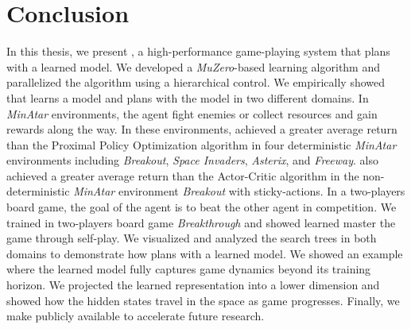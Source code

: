 \chapter{Conclusion}

In this thesis, we present \moozi, a high-performance game-playing system that plans with a learned model.
We developed a \textit{MuZero}-based learning algorithm and parallelized the algorithm using a hierarchical control.
We empirically showed that \moozi learns a model and plans with the model in two different domains.
In \textit{MinAtar} environments, the agent fight enemies or collect resources and gain rewards along the way.
In these environments, \moozi achieved a greater average return than the Proximal Policy Optimization algorithm in four deterministic \textit{MinAtar} environments including \textit{Breakout}, \textit{Space Invaders}, \textit{Asterix}, and \textit{Freeway}.
\moozi also achieved a greater average return than the Actor-Critic algorithm in the non-deterministic \textit{MinAtar} environment \textit{Breakout} with sticky-actions.
In a two-players board game, the goal of the agent is to beat the other agent in competition.
We trained \moozi in two-players board game \textit{Breakthrough} and showed \moozi learned master the game through self-play.
We visualized and analyzed the search trees in both domains to demonstrate how \moozi plans with a learned model.
We showed an example where the learned model fully captures game dynamics beyond its training horizon.
We projected the learned representation into a lower dimension and showed how the hidden states travel in the space as game progresses.
Finally, we make \moozi publicly available to accelerate future research.